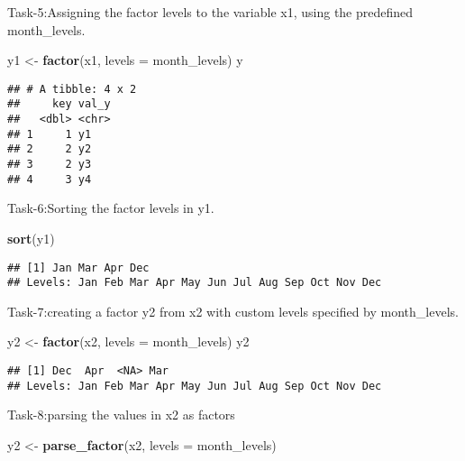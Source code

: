 \documentclass[
]{article}
\newenvironment{Shaded}{\begin{snugshade}}{\end{snugshade}}
\newcommand{\AttributeTok}[1]{\textcolor[rgb]{0.13,0.29,0.53}{#1}}
\newcommand{\FunctionTok}[1]{\textcolor[rgb]{0.13,0.29,0.53}{\textbf{#1}}}
\newcommand{\NormalTok}[1]{#1}
\newcommand{\OtherTok}[1]{\textcolor[rgb]{0.56,0.35,0.01}{#1}}
\begin{document}
Task-5:Assigning the factor levels to the variable x1, using the
predefined month\_levels.

\begin{Shaded}
\begin{Highlighting}[]
\NormalTok{y1 }\OtherTok{\textless{}{-}} \FunctionTok{factor}\NormalTok{(x1, }\AttributeTok{levels =}\NormalTok{ month\_levels)}
\NormalTok{y}
\end{Highlighting}
\end{Shaded}

\begin{verbatim}
## # A tibble: 4 x 2
##     key val_y
##   <dbl> <chr>
## 1     1 y1   
## 2     2 y2   
## 3     2 y3   
## 4     3 y4
\end{verbatim}

Task-6:Sorting the factor levels in y1.

\begin{Shaded}
\begin{Highlighting}[]
\FunctionTok{sort}\NormalTok{(y1)}
\end{Highlighting}
\end{Shaded}

\begin{verbatim}
## [1] Jan Mar Apr Dec
## Levels: Jan Feb Mar Apr May Jun Jul Aug Sep Oct Nov Dec
\end{verbatim}

Task-7:creating a factor y2 from x2 with custom levels specified by
month\_levels.

\begin{Shaded}
\begin{Highlighting}[]
\NormalTok{y2 }\OtherTok{\textless{}{-}} \FunctionTok{factor}\NormalTok{(x2, }\AttributeTok{levels =}\NormalTok{ month\_levels)}
\NormalTok{y2}
\end{Highlighting}
\end{Shaded}

\begin{verbatim}
## [1] Dec  Apr  <NA> Mar 
## Levels: Jan Feb Mar Apr May Jun Jul Aug Sep Oct Nov Dec
\end{verbatim}

Task-8:parsing the values in x2 as factors

\begin{Shaded}
\begin{Highlighting}[]
\NormalTok{y2 }\OtherTok{\textless{}{-}} \FunctionTok{parse\_factor}\NormalTok{(x2, }\AttributeTok{levels =}\NormalTok{ month\_levels)}
\end{Highlighting}
\end{Shaded}
\end{document}
